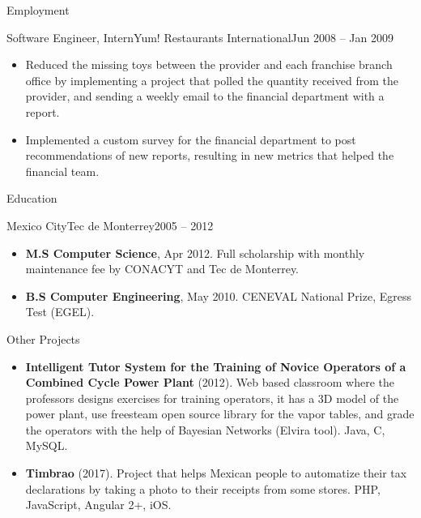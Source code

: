 \documentclass[calibri]{../macdowell-cv/mcdowellcv}
\begin{document}
\begin{cvsection}{Employment}
		\begin{cvsubsection}{Software Engineer, Intern}{Yum! Restaurants International}{Jun 2008 -- Jan 2009}
			\begin{itemize}
				\item Reduced the missing toys between the provider and each franchise branch office by implementing a project that polled the quantity received from the provider, and sending a weekly email to the financial department with a report.
				\item Implemented a custom survey for the financial department to post recommendations of new reports, resulting in new metrics that helped the financial team.
			\end{itemize}
		\end{cvsubsection}
	\end{cvsection}

	\pagebreak

	\begin{cvsection}{Education}
		\begin{cvsubsection}{Mexico City}{Tec de Monterrey}{2005 -- 2012}
			\begin{itemize}
				\item \textbf{M.S Computer Science}, Apr 2012. Full scholarship with monthly maintenance fee by CONACYT and Tec de Monterrey.
				\item \textbf{B.S Computer Engineering}, May 2010. CENEVAL National Prize, Egress Test (EGEL).
			\end{itemize}
		\end{cvsubsection}
	\end{cvsection}
	
	\begin{cvsection}{Other Projects}
		\begin{cvsubsection}{}{}{}	
			\begin{itemize}
				\item \textbf{Intelligent Tutor System for the Training of Novice Operators of a Combined Cycle Power Plant} (2012). Web based classroom where the professors designs exercises for training operators, it has a 3D model of the power plant, use freesteam open source library for the vapor tables, and grade the operators with the help of Bayesian Networks (Elvira tool). Java, C, MySQL.
				\item \textbf{Timbrao} (2017). Project that helps Mexican people to automatize their tax declarations by taking a photo to their receipts from some stores.  PHP, JavaScript, Angular 2+, iOS.
			\end{itemize}
		\end{cvsubsection}
	\end{cvsection}
	
\end{document}
